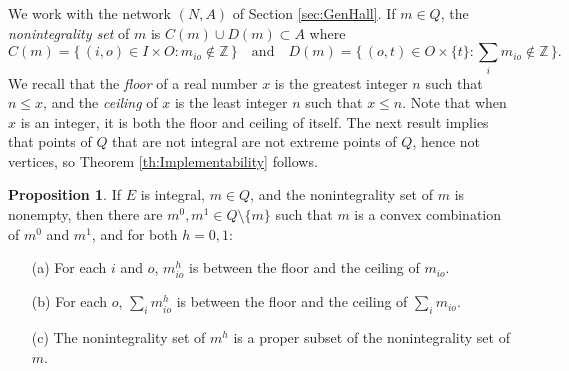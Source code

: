 \documentclass[12pt]{article}
\theoremstyle{definition}
\newtheorem{prop}{Proposition}
\newcommand{\In}{\mathbb{Z}}
\begin{document}
We work with the network $(N,A)$ of Section \ref{sec:GenHall}.  If $m \in Q$, the \emph{nonintegrality set} of $m$ is $C(m) \cup D(m) \subset A$ where
$$C(m) = \{\, (i,o) \in I \times O : m_{io} \notin \In \,\} \quad \text{and} \quad D(m) = \{\, (o,t) \in O \times \{t\} : \sum_i m_{io} \notin \In \,\}.$$
We recall that the \emph{floor} of a real number $x$ is the greatest integer $n$ such that $n \le x$, and the  \emph{ceiling} of $x$ is the least integer $n$ such that $x \le n$.  Note that when $x$ is an integer, it is both the floor and ceiling of itself.  The next result implies that points of $Q$ that are not integral are not extreme points of $Q$, hence not vertices, so Theorem \ref{th:Implementability} follows.

\begin{prop} \label{th:ConvexComb}
  If $E$ is integral, $m \in Q$, and the nonintegrality set of $m$ is nonempty, then there are $m^0, m^1 \in Q \setminus \{m\}$ such that $m$ is a convex combination of $m^0$ and $m^1$, and for both $h = 0,1$:
  \begin{enumerate}
     \item[(a)] For each $i$ and $o$, $m^h_{io}$ is between the floor and the ceiling of $m_{io}$.
     \item[(b)] For each $o$, $\sum_i m^h_{io}$ is between the floor and the ceiling of $\sum_i m_{io}$.
     \item[(c)] The nonintegrality set of $m^h$ is a proper subset of the nonintegrality set of $m$.
  \end{enumerate}
\end{prop}
\end{document}
